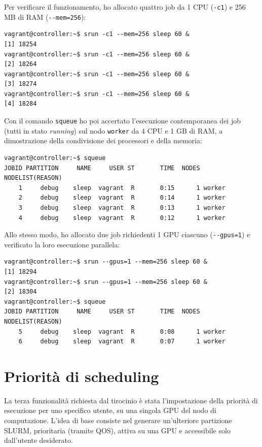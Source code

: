 \documentclass[12pt,a4paper,twoside,openright]{book}
\begin{document}
Per verificare il funzionamento, ho allocato quattro job da 1 \ac{CPU} (\texttt{-c1}) e 256 \ac{MB} di \ac{RAM} (\texttt{{-}{-}mem=256}):
\begin{verbatim}
vagrant@controller:~$ srun -c1 --mem=256 sleep 60 &
[1] 18254
vagrant@controller:~$ srun -c1 --mem=256 sleep 60 &
[2] 18264
vagrant@controller:~$ srun -c1 --mem=256 sleep 60 &
[3] 18274
vagrant@controller:~$ srun -c1 --mem=256 sleep 60 &
[4] 18284
\end{verbatim}
Con il comando \texttt{squeue} ho poi accertato l'esecuzione contemporanea dei job (tutti in stato \textit{running}) sul nodo \texttt{worker} da 4 \ac{CPU} e 1 GB di \ac{RAM}, a dimostrazione della condivisione dei processori e della memoria:
\begin{verbatim}
vagrant@controller:~$ squeue
JOBID PARTITION     NAME     USER ST       TIME  NODES NODELIST(REASON)
    1     debug    sleep  vagrant  R       0:15      1 worker
    2     debug    sleep  vagrant  R       0:14      1 worker
    3     debug    sleep  vagrant  R       0:13      1 worker
    4     debug    sleep  vagrant  R       0:12      1 worker
\end{verbatim}
Allo stesso modo, ho allocato due job richiedenti 1 \ac{GPU} ciascuno (\texttt{{-}{-}gpus=1}) e verificato la loro esecuzione parallela:
\begin{verbatim}
vagrant@controller:~$ srun --gpus=1 --mem=256 sleep 60 &
[1] 18294
vagrant@controller:~$ srun --gpus=1 --mem=256 sleep 60 &
[2] 18304
vagrant@controller:~$ squeue
JOBID PARTITION     NAME     USER ST       TIME  NODES NODELIST(REASON)
    5     debug    sleep  vagrant  R       0:08      1 worker
    6     debug    sleep  vagrant  R       0:07      1 worker
\end{verbatim}

\section{Priorità di scheduling}
La terza funzionalità richiesta dal tirocinio è stata l'impostazione della priorità di esecuzione per uno specifico utente, su una singola \ac{GPU} del nodo di computazione. L'idea di base consiste nel generare un'ulteriore partizione \ac{SLURM}, prioritaria (tramite \ac{QOS}), attiva su una \ac{GPU} e accessibile solo dall'utente desiderato.
\end{document}
